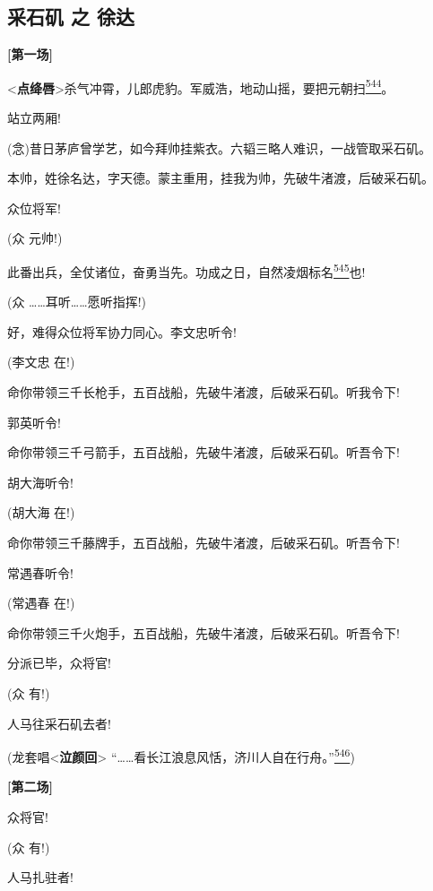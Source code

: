 \newpage
{}
\hypertarget{ux91c7ux77f3ux77f6-ux4e4b-ux5f90ux8fbe}{%
\subsection{采石矶 之
徐达}\label{ux91c7ux77f3ux77f6-ux4e4b-ux5f90ux8fbe}}

\textbf{{[}第一场{]}}

\textless{}\textbf{点绛唇}\textgreater{}杀气冲霄，儿郎虎豹。军威浩，地动山摇，要把元朝扫\protect\hyperlink{fn544}{\textsuperscript{544}}。

站立两厢!

(念)昔日茅庐曾学艺，如今拜帅挂紫衣。六韬三略人难识，一战管取采石矶。

本帅，姓徐名达，字天德。蒙主重用，挂我为帅，先破牛渚渡，后破采石矶。

众位将军!

(众 元帅!)

此番出兵，全仗诸位，奋勇当先。功成之日，自然凌烟标名\protect\hyperlink{fn545}{\textsuperscript{545}}也!

(众 \ldots{}\ldots{}耳听\ldots{}\ldots{}愿听指挥!)

好，难得众位将军协力同心。李文忠听令!

(李文忠 在!)

命你带领三千长枪手，五百战船，先破牛渚渡，后破采石矶。听我令下!

郭英听令!

命你带领三千弓箭手，五百战船，先破牛渚渡，后破采石矶。听吾令下!

胡大海听令!

(胡大海 在!)

命你带领三千藤牌手，五百战船，先破牛渚渡，后破采石矶。听吾令下!

常遇春听令!

(常遇春 在!)

命你带领三千火炮手，五百战船，先破牛渚渡，后破采石矶。听吾令下!

分派已毕，众将官!

(众 有!)

人马往采石矶去者!

(龙套唱\textless{}\textbf{泣颜回}\textgreater{}
``\ldots{}\ldots{}看长江浪息风恬，济川人自在行舟。''\protect\hyperlink{fn546}{\textsuperscript{546}})

\textbf{{[}第二场{]}}

众将官!

(众 有!)

人马扎驻者!

